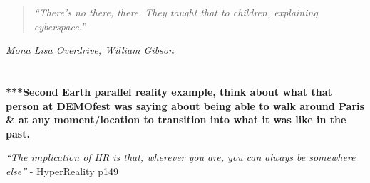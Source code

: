 \begin{quote}
	\textit{``There's no there, there. They taught that to children, explaining cyberspace.''}
\end{quote}
\hfill \textit{Mona Lisa Overdrive, William Gibson}
\\
\\
\\





\textbf{***Second Earth parallel reality example, think about what that person at DEMOfest was saying about being able to walk around Paris \& at any moment/location to transition into what it was like in the past.}

\textit{``The implication of HR is that, wherever you are, you can always be somewhere else''} - HyperReality p149



